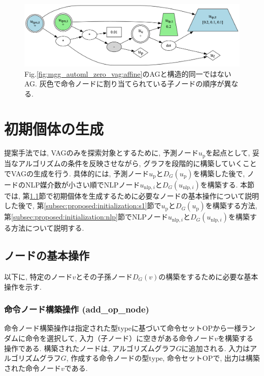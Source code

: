 \documentclass[11pt,oneside,openany,report]{jsbook}
\begin{document}
\begin{figure}
  \centering
  \includegraphics[width=14cm]{mgg_automl_zero_vag/ag/neq2.png}
  \caption{Fig.\ref{fig:mgg_automl_zero_vag:affine}のAGと構造的同一ではないAG. 灰色で命令ノードに割り当てられている子ノードの順序が異なる.}
  \label{fig:mgg_automl_zero_vag:neq2}
\end{figure}

\section{初期個体の生成}\label{sec:proposed:initialization}

提案手法では, VAGのみを探索対象とするために, 予測ノード$u_\mathrm{p}$を起点として, 妥当なアルゴリズムの条件を反映させながら, グラフを段階的に構築していくことでVAGの生成を行う. 具体的には, 予測ノード$u_\mathrm{p}$と$D_G(u_\mathrm{p})$を構築した後で, ノードのNLP媒介数が小さい順でNLPノード$u_{\mathrm{nlp},i}$と$D_G(u_{\mathrm{nlp},i})$を構築する. 本節では, 第\ref{subsec:proposed:initialization:basic_operation}節で初期個体を生成するために必要なノードの基本操作について説明した後で, 第\ref{subsec:proposed:initialization:s1}節で$u_\mathrm{p}$と$D_G(u_\mathrm{p})$を構築する方法, 第\ref{subsec:proposed:initialization:nlp}節でNLPノード$u_{\mathrm{nlp},i}$と$D_G(u_{\mathrm{nlp},i})$を構築する方法について説明する.

\subsection{ノードの基本操作} \label{subsec:proposed:initialization:basic_operation}

以下に, 特定のノード$v$とその子孫ノード$D_G(v)$の構築をするために必要な基本操作を示す.

\subsubsection{命令ノード構築操作 (add\_op\_node)}

命令ノード構築操作は指定された型$\mathrm{type}$に基づいて命令セット$\mathrm{OP}$から一様ランダムに命令を選択して, 入力（子ノード）に空きがある命令ノード$v$を構築する操作である. 構築されたノードは, アルゴリズムグラフ$G$に追加される. 入力はアルゴリズムグラフ$G$, 作成する命令ノードの型$\mathrm{type}$, 命令セット$\mathrm{OP}$で, 出力は構築された命令ノード$v$である.
\end{document}
